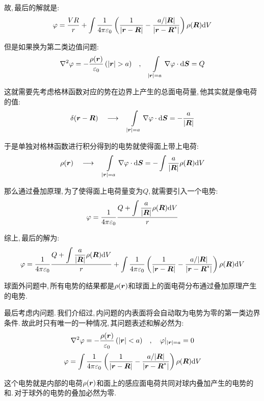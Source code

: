 故,\,最后的解就是:
\[\varphi=\frac{VR}{r}+\int \frac{1}{4\pi\varepsilon_0} \left(\frac{1}{|\boldsymbol{r}-\boldsymbol{R}|}-\frac{a/|\boldsymbol{R}|}{|\boldsymbol{r}-\boldsymbol{R}^\ast|}\right)\rho(\boldsymbol{R})\textrm{d} V\]

但是如果换为第二类边值问题:
\[\nabla^2\varphi = -\frac{\rho(\bs{r})}{\varepsilon_0}\,(|\bs{r}|>a)\quad ,\quad \int\limits_{|\bs{r}|=a}\nabla\varphi\cdot \ud \bs{S}=Q\]

这就需要先考虑格林函数对应的势在边界上产生的总面电荷量,\,他其实就是像电荷的值:
\[\delta(\boldsymbol{r}-\boldsymbol{R})\quad \longrightarrow\quad  \int\limits_{|\boldsymbol{r}|=a}\nabla\varphi\cdot \textrm{d} \boldsymbol{S}=-\frac{a}{|\boldsymbol{R}|}\]

于是单独对格林函数进行积分得到的电势就使得面上带上电荷:
\[\rho(\boldsymbol{r})\quad \longrightarrow\quad \int\limits_{|\boldsymbol{r}|=a}\nabla\varphi\cdot \textrm{d} \boldsymbol{S}=-\int \frac{a}{|\boldsymbol{R}|}\rho(\boldsymbol{R})\textrm{d} V\]

那么通过叠加原理,\,为了使得面上电荷量变为$Q$,\,就需要引入一个电势:
\[\varphi=\frac{1}{4\pi\varepsilon_0} \frac{Q+\displaystyle\int \frac{a}{|\boldsymbol{R}|}\rho(\boldsymbol{R})\textrm{d} V}{r}\]

综上,\,最后的解为:
\[\varphi =\frac{1}{4\pi\varepsilon_0} \frac{Q+\displaystyle\int \frac{a}{|\boldsymbol{R}|}\rho(\boldsymbol{R})\textrm{d} V}{r}+\int \frac{1}{4\pi\varepsilon_0} \left(\frac{1}{|\boldsymbol{r}-\boldsymbol{R}|}-\frac{a/|\boldsymbol{R}|}{|\boldsymbol{r}-\boldsymbol{R}^\ast|}\right)\rho(\boldsymbol{R})\textrm{d} V \]

球面外问题中,\,所有电势的结果都是$\rho(\boldsymbol{r})$和球面上的面电荷分布通过叠加原理产生的电势.

最后考虑内问题.\,我们介绍过,\,内问题的内表面将会自动取为电势为零的第一类边界条件.\,故此时只有唯一的一种情况,\,其问题表述和解必然为:
\[\nabla^2\varphi = -\frac{\rho(\boldsymbol{r})}{\varepsilon_0}\,(|\boldsymbol{r}|<a)\quad ,\quad \varphi|_{|\boldsymbol{r}|=a}=0\]
\[\varphi=\int \frac{1}{4\pi\varepsilon_0} \left(\frac{1}{|\boldsymbol{r}-\boldsymbol{R}|}-\frac{a/|\boldsymbol{R}|}{|\boldsymbol{r}-\boldsymbol{R}^\ast|}\right)\rho(\boldsymbol{R})\textrm{d} V\]

这个电势就是内部的电荷$\rho(\boldsymbol{r})$和面上的感应面电荷共同对球内叠加产生的电势的和.\,对于球外的电势的叠加必然为零.



